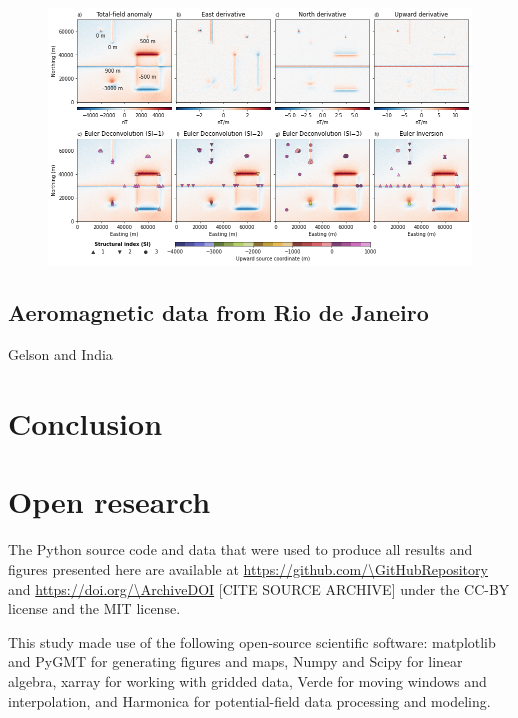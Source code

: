 \begin{figure}[tb!]
\centering
\includegraphics[width=1\linewidth]{figures/synthetic-windows.png}
\caption{
  \lipsum[1]
}
\label{fig:windows}
\end{figure}

\subsection{Aeromagnetic data from Rio de Janeiro}

Gelson and India


\section{Conclusion}



\section*{Open research}

The Python source code and data that were used to produce all results and
figures presented here are available at
\url{https://github.com/\GitHubRepository}
and
\url{https://doi.org/\ArchiveDOI}
[CITE SOURCE ARCHIVE]
under the CC-BY license and the MIT license.

This study made use of the following open-source scientific software:
matplotlib \citep{matplotlib} and PyGMT \citep{pygmt} for generating figures
and maps,
Numpy \citep{numpy} and Scipy \citep{scipy} for linear algebra,
xarray \citep{xarray} for working with gridded data,
Verde \citep{verde} for moving windows and interpolation,
and
Harmonica \citep{harmonica} for potential-field data processing and modeling.

